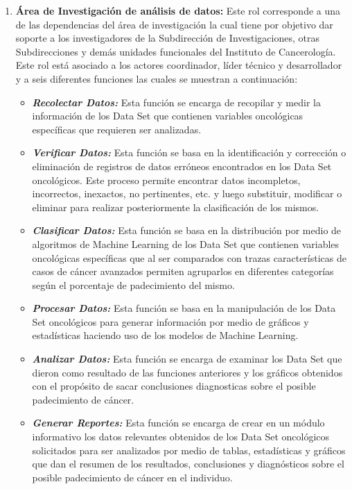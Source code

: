 \begin{enumerate}[label=\textbf{\arabic*})]
\item  \textbf{Área de Investigación de análisis de datos:} Este rol corresponde  a una de las dependencias del área de investigación la cual  tiene por objetivo dar soporte a los investigadores de la Subdirección de Investigaciones, otras Subdirecciones y demás unidades funcionales del Instituto  de Cancerología. Este rol está asociado a los actores coordinador, líder técnico y desarrollador y a seis diferentes funciones las cuales se muestran a continuación:
\newpage
\begin{itemize}
\item  \textbf{\textit{Recolectar Datos:}} Esta función se encarga de recopilar y medir la información de los Data Set que contienen variables oncológicas específicas que requieren ser analizadas.

\item  \textbf{\textit{Verificar Datos:}}  Esta función se basa en la identificación  y corrección o eliminación de registros de datos erróneos encontrados en los Data Set oncológicos. Este proceso permite encontrar datos incompletos, incorrectos, inexactos, no pertinentes, etc. y luego substituir, modificar o eliminar para realizar posteriormente la clasificación de los mismos.

\item  \textbf{\textit{Clasificar Datos:}} Esta función se basa en la distribución por medio de algoritmos de Machine Learning de los Data Set que contienen variables oncológicas específicas que al ser comparados con trazas características de casos de cáncer avanzados permiten agruparlos en diferentes categorías según el porcentaje de padecimiento del mismo.

\item  \textbf{\textit{Procesar Datos:}} Esta función se basa en la manipulación de los Data Set oncológicos  para generar información por medio de gráficos y estadísticas haciendo uso de los modelos de Machine Learning.

\item  \textbf{\textit{Analizar Datos:}} Esta función se encarga de examinar los Data Set que dieron como resultado de las funciones anteriores y los gráficos obtenidos con el propósito de sacar conclusiones diagnosticas sobre el posible padecimiento de cáncer.

\item  \textbf{\textit{Generar Reportes:}} Esta función se encarga de crear en un módulo informativo los datos relevantes obtenidos de los Data Set oncológicos solicitados para ser analizados por medio de tablas, estadísticas y gráficos que dan el resumen de los resultados, conclusiones y diagnósticos sobre el posible padecimiento de cáncer en el individuo.
\end{itemize}
\end{enumerate}

